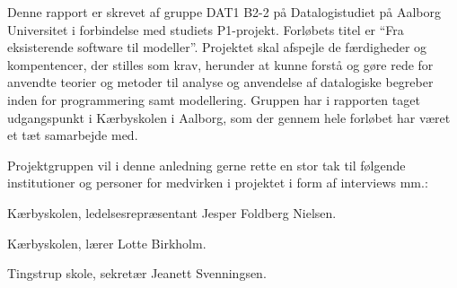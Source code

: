 Denne rapport er skrevet af gruppe DAT1 B2-2 på Datalogistudiet på Aalborg Universitet i forbindelse med studiets P1-projekt. Forløbets titel er ``Fra eksisterende software til modeller''. Projektet skal afspejle de færdigheder og kompentencer, der stilles som krav, herunder at kunne forstå og gøre rede for anvendte teorier og metoder til analyse og anvendelse af datalogiske begreber inden for programmering samt modellering. Gruppen har i rapporten taget udgangspunkt i Kærbyskolen i Aalborg, som der gennem hele forløbet har været et tæt samarbejde med.

Projektgruppen vil i denne anledning gerne rette en stor tak til følgende institutioner og personer for medvirken i projektet i form af interviews mm.:

Kærbyskolen, ledelsesrepræsentant Jesper Foldberg Nielsen.

Kærbyskolen, lærer Lotte Birkholm.

Tingstrup skole, sekretær Jeanett Svenningsen.